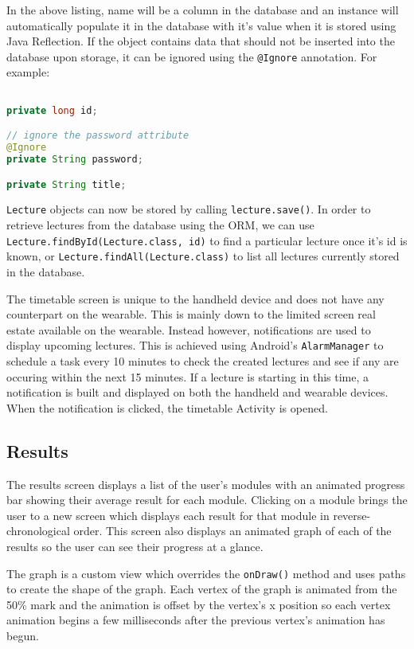 In the above listing, name will be a column in the database and an instance will
automatically populate it in the database with it's value when it is stored
using Java Reflection. If the object contains data that should not be inserted
into the database upon storage, it can be ignored using the \texttt{@Ignore}
annotation. For example:

\begin{lstlisting}[language=Java]

private long id;

// ignore the password attribute
@Ignore
private String password;

private String title;

\end{lstlisting}

\texttt{Lecture} objects can now be stored by calling \texttt{lecture.save()}.
In order to retrieve lectures from the database using the ORM, we can use
\texttt{Lecture.findById(Lecture.class, id)} to find a particular lecture once
it's id is known, or \texttt{Lecture.findAll(Lecture.class)} to list all
lectures currently stored in the database.

The timetable screen is unique to the handheld device and does not have any
counterpart on the wearable. This is mainly down to the limited screen
real estate available on the wearable. Instead however, notifications are used
to display upcoming lectures. This is achieved using Android's
\texttt{AlarmManager} to schedule a task every 10 minutes to check the created
lectures and see if any are occuring within the next 15 minutes. If a lecture
is starting in this time, a notification is built and displayed on both the
handheld and wearable devices. When the notification is clicked, the timetable
Activity is opened.

\subsection{Results}
The results screen displays a list of the user's modules with an animated
progress bar showing their average result for each module. Clicking on a module
brings the user to a new screen which displays each result for that module in
reverse-chronological order. This screen also displays an animated graph of
each of the results so the user can see their progress at a glance.

The graph is a custom view which overrides the \texttt{onDraw()} method and uses
paths to create the shape of the graph. Each vertex of the graph is animated
from the 50\% mark and the animation is offset by the vertex's x position so
each vertex animation begins a few milliseconds after the previous vertex's
animation has begun.

